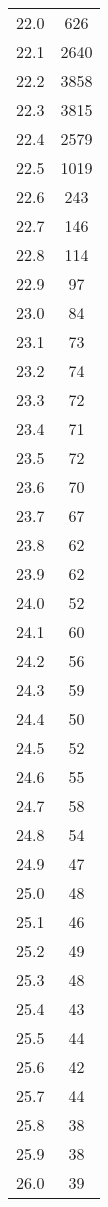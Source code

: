 \begin{tabular}{S[table-format=2.1]S[table-format=4.0]}
		22.0 &  626 \\
		22.1 & 2640 \\
		22.2 & 3858 \\
		22.3 & 3815 \\
		22.4 & 2579 \\
		22.5 & 1019 \\
		22.6 &  243 \\
		22.7 &  146 \\
		22.8 &  114 \\
		22.9 &   97 \\
		23.0 &   84 \\
		23.1 &   73 \\
		23.2 &   74 \\
		23.3 &   72 \\
		23.4 &   71 \\
		23.5 &   72 \\
		23.6 &   70 \\
		23.7 &   67 \\
		23.8 &   62 \\
		23.9 &   62 \\
		24.0 &   52 \\
		24.1 &   60 \\
		24.2 &   56 \\
		24.3 &   59 \\
		24.4 &   50 \\
		24.5 &   52 \\
		24.6 &   55 \\
		24.7 &   58 \\
		24.8 &   54 \\
		24.9 &   47 \\
		25.0 &   48 \\
		25.1 &   46 \\
		25.2 &   49 \\
		25.3 &   48 \\
		25.4 &   43 \\
		25.5 &   44 \\
		25.6 &   42 \\
		25.7 &   44 \\
		25.8 &   38 \\
		25.9 &   38 \\
		26.0 &   39 \\
		\bottomrule
	\end{tabular}
